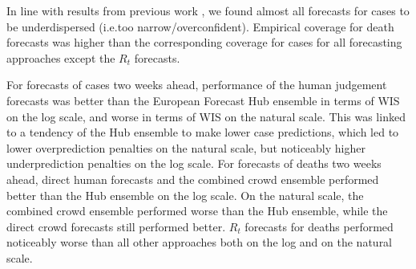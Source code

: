 \documentclass[10pt,a4paper,twocolumn]{article}
\providecommand{\DIFaddtex}[1]{{\protect\color{blue}\uwave{#1}}} %
\providecommand{\DIFaddbegin}{} %
\providecommand{\DIFaddend}{} %
\providecommand{\DIFadd}[1]{\texorpdfstring{\DIFaddtex{#1}}{#1}} %
\begin{document}
\DIFaddend %
In line with results from previous work \citep{bosseComparingHumanModelbased2022, sherrattPredictivePerformanceMultimodel2022}, we found almost all forecasts for cases to be underdispersed (i.e.\DIFaddbegin \DIFadd{, }\DIFaddend too narrow/overconfident). Empirical coverage for death forecasts was higher than the corresponding coverage for cases for all forecasting approaches except the $R_t$ forecasts. 

For forecasts of cases two weeks ahead, performance of the human judgement forecasts was better than the European Forecast Hub ensemble in terms of WIS on the log scale, and worse in terms of WIS on the natural scale. This was linked to a tendency of the Hub ensemble to make lower case predictions, which led to lower overprediction penalties on the natural scale, but noticeably higher underprediction penalties on the log scale. 
For forecasts of deaths two weeks ahead, direct human forecasts and the combined crowd ensemble performed better than the Hub ensemble on the log scale. On the natural scale, the combined crowd ensemble performed worse than the Hub ensemble, while the direct crowd forecasts still performed better. $R_t$ forecasts for deaths performed noticeably worse than all other approaches both on the log and on the natural scale. 
\end{document}

